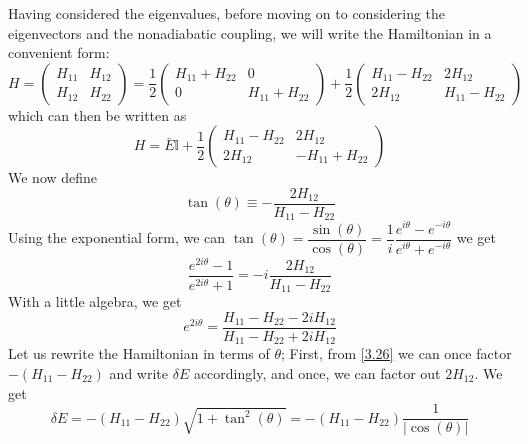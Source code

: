 \documentclass[12pt,a4paper]{article}
\begin{document}
	Having considered the eigenvalues, before moving on to considering the eigenvectors and the nonadiabatic coupling, we will write the Hamiltonian in a convenient form:
	\begin{equation}
		H = 
		\begin{pmatrix}
			H_{11} & H_{12} \\
			H_{12} & H_{22}
		\end{pmatrix}
		= \dfrac{1}{2}
		\begin{pmatrix}
			H_{11} + H_{22} & 0 \\
			0 & H_{11} + H_{22}
		\end{pmatrix}
		+ \dfrac{1}{2}
		\begin{pmatrix}
			H_{11} - H_{22} & 2H_{12} \\
			2H_{12} & H_{11} - H_{22}
		\end{pmatrix}
	\end{equation}
	which can then be written as
	\begin{equation}
		H = \bar{E} \mathbb{I} + \dfrac{1}{2} 
		\begin{pmatrix}
			H_{11} - H_{22} & 2H_{12} \\
			2H_{12} & -H_{11} + H_{22}
		\end{pmatrix}
	\end{equation}
	We now define
	\begin{equation}
		\tan(\theta) \equiv -\dfrac{2H_{12}}{H_{11} - H_{22}} \label{3.50}
	\end{equation}
	Using the exponential form, we can $\tan(\theta) = \dfrac{\sin(\theta)}{\cos(\theta)} = \dfrac{1}{i} \dfrac{e^{i\theta} - e^{-i\theta}}{e^{i\theta} + e^{-i\theta}}$ we get
	\begin{equation}
		\dfrac{e^{2i\theta} - 1}{e^{2i\theta} + 1} = -i \dfrac{2H_{12}}{H_{11} - H_{22}}
	\end{equation}
	With a little algebra, we get
	\begin{equation}
		e^{2i\theta} = \dfrac{H_{11} - H_{22} - 2iH_{12}}{H_{11} - H_{22} + 2iH_{12}} \label{3.52}
	\end{equation}
	Let us rewrite the Hamiltonian in terms of $\theta$; First, from \eqref{3.26} we can once factor $-\left( H_{11} - H_{22} \right)$ and write $\delta E$ accordingly, and once, we can factor out $2H_{12}$. We get
	\begin{equation}
		\delta E = -\left( H_{11} - H_{22} \right) \sqrt{1 + 
	\tan^{2}(\theta)} = -\left( H_{11} - H_{22} \right) \dfrac{1}{\left| \cos(\theta) \right|}
	\end{equation}
\end{document}
